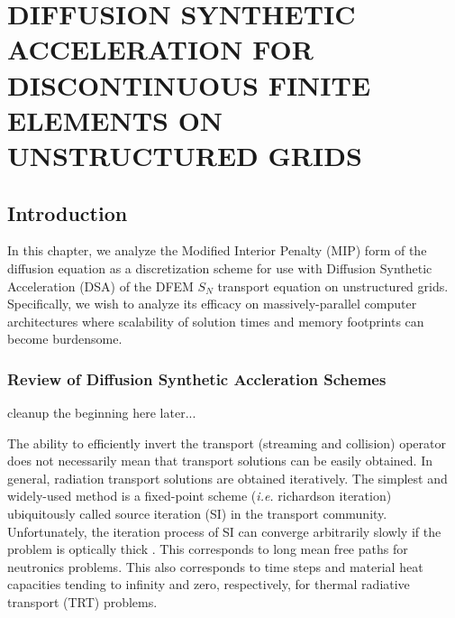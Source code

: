 %
%
%
\chapter{\uppercase {Diffusion Synthetic Acceleration for Discontinuous Finite Elements on Unstructured Grids}}
\label{sec::DSA}

\section{Introduction}
\label{sec::DSA_Introduction}

In this chapter, we analyze the Modified Interior Penalty (MIP) form of the diffusion equation as a discretization scheme for use with Diffusion Synthetic Acceleration (DSA) of the DFEM $S_N$ transport equation on unstructured grids. Specifically, we wish to analyze its efficacy on massively-parallel computer architectures where scalability of solution times and memory footprints can become burdensome.

\subsection{Review of Diffusion Synthetic Accleration Schemes}
\label{sec::DSA_Introduction_History}

cleanup the beginning here later...

The ability to efficiently invert the transport (streaming and collision) operator does not necessarily mean that transport solutions can be easily obtained. In general, radiation transport solutions are obtained iteratively. The simplest and widely-used method is a fixed-point scheme ({\em i.e.} richardson iteration) ubiquitously called source iteration (SI) in the transport community. Unfortunately, the iteration process of SI can converge arbitrarily slowly if the problem is optically thick \cite{ref::adams_larsen_iter_methods}. This corresponds to long mean free paths for neutronics problems. This also corresponds to time steps and material heat capacities tending to infinity and zero, respectively, for thermal radiative transport (TRT) problems.

